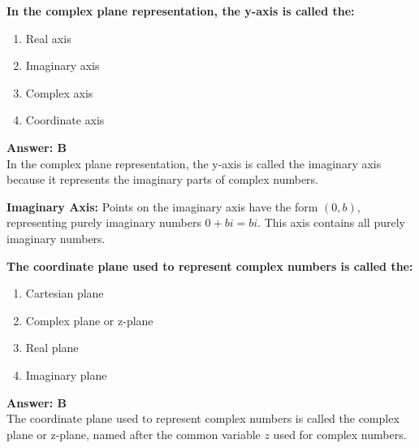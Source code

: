 \documentclass[12pt,a4paper]{article}
\begin{document}
\newpage
\begin{questiontitle}[MCQ 76]
\textbf{In the complex plane representation, the y-axis is called the:}
\end{questiontitle}

\begin{partbox}[Options]
\begin{enumerate}[label=\Alph*.]
    \item Real axis
    \item Imaginary axis
    \item Complex axis
    \item Coordinate axis
\end{enumerate}
\end{partbox}

\begin{answerstyle}
\textbf{Answer: B} \\
In the complex plane representation, the y-axis is called the imaginary axis because it represents the imaginary parts of complex numbers.
\end{answerstyle}

\begin{conceptbox}
\textbf{Imaginary Axis:} Points on the imaginary axis have the form \( (0, b) \), representing purely imaginary numbers \( 0 + bi = bi \). This axis contains all purely imaginary numbers.
\end{conceptbox}

\newpage
\begin{questiontitle}[MCQ 77]
\textbf{The coordinate plane used to represent complex numbers is called the:}
\end{questiontitle}

\begin{partbox}[Options]
\begin{enumerate}[label=\Alph*.]
    \item Cartesian plane
    \item Complex plane or z-plane
    \item Real plane
    \item Imaginary plane
\end{enumerate}
\end{partbox}

\begin{answerstyle}
\textbf{Answer: B} \\
The coordinate plane used to represent complex numbers is called the complex plane or z-plane, named after the common variable \( z \) used for complex numbers.
\end{answerstyle}
\end{document}
